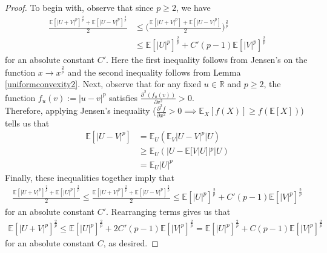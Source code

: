 \documentclass[11pt, reqno,english]{amsart}
\begin{document}
\begin{proof}
To begin with, observe that since $p \geq 2$, we have
\begin{align*}
\frac{\mathbb{E}[|U+V|^p]^{\frac{2}{p}} + \mathbb{E}[|U - V|^p]^{\frac{2}{p}}}{2} &\leq \bigg(\frac{\mathbb{E}[|U+V|^p] + \mathbb{E}[|U-V|^p]}{2}\bigg)^{\frac{2}{p}}
\\
&\leq \mathbb{E}[|U|^p]^{\frac{2}{p}} + C'(p-1)\mathbb{E}[|V|^p]^{\frac{2}{p}}
\end{align*}
for an absolute constant $C'$. Here the first inequality follows from Jensen's on the function $x \to x^{\frac{2}{p}}$ and the second inequality follows from Lemma \ref{uniformconvexity2}. Next, observe that for any fixed $u \in \mathbb{R}$ and $p \geq 2$, the function $f_u(v) := |u - v|^p$ satisfies $\frac{\partial^2(f_u(v))}{\partial v^2} > 0$.
\\
Therefore, applying Jensen's inequality \bigg($\frac{\partial^2 f}{\partial x^2} > 0 \implies \mathbb{E}_{X}[f(X)] \geq f(\mathbb{E}[X])$\bigg) tells us that
\begin{align*}
\mathbb{E}[|U - V|^p] &= \mathbb{E}_{U}(\mathbb{E}_V |U - V|^p | U)
\\
&\geq \mathbb{E}_U(|U - \mathbb{E}[V|U]|^p | U)
\\
&= \mathbb{E}_U |U|^p
\end{align*}
Finally, these inequalities together imply that
\begin{align*}
\frac{\mathbb{E}[|U + V|^p]^{\frac{2}{p}} + \mathbb{E}[|U|^p]^{\frac{2}{p}}}{2} \leq \frac{\mathbb{E}[|U+V|^p]^{\frac{2}{p}} + \mathbb{E}[|U - V|^p]^{\frac{2}{p}}}{2} \leq \mathbb{E}[|U|^p]^{\frac{2}{p}} + C'(p-1)\mathbb{E}[|V|^p]^{\frac{2}{p}}
\end{align*}
for an absolute constant $C'$. Rearranging terms gives us that
\begin{align*}
\mathbb{E}[|U + V|^p]^{\frac{2}{p}} \leq \mathbb{E}[|U|^p]^{\frac{2}{p}} + 2C'(p-1) \mathbb{E}[|V|^p]^{\frac{2}{p}} = \mathbb{E}[|U|^p]^{\frac{2}{p}} + C(p-1) \mathbb{E}[|V|^p]^{\frac{2}{p}} 
\end{align*}
for an absolute constant $C$, as desired.
\end{proof}
\end{document}
